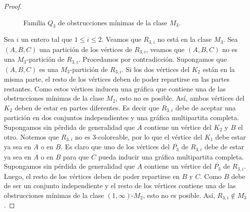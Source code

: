 \begin{proof}
\begin{figure}[ht!]
\begin{subfigure}{\textwidth}
\begin{center}
\end{center}
\end{subfigure}

\caption{Familia $Q_3$ de obstrucciones mínimas de la clase $M_3$.}
\label{obsts_M3_Q}
\end{figure}

Sea $i$ un entero tal que $1\le i \le 2$. Veamos que $R_{3,i}$ no está en la clase $M_3$. Sea $(A,B,C)$ una partición de los vértices de $R_{3,i}$, veamos que $(A,B,C)$ no es una $M_3$-partición de $R_{3,i}$. Procedamos por contradicción. Supongamos que $(A,B,C)$ es una $M_3$-partición de $R_{3,i}$. Si los dos vértices del $K_2$ están en la misma parte, el resto de los vértices deben de poder repartirse en las partes restantes. Como estos vértices inducen una gráfica que contiene una de las obstrucciones mínimas de la clase $M_2$, esto no es posible. Así, ambos vértices del $K_2$ deben de estar en partes diferentes. Es decir que $R_{3,i}$ debe de aceptar una partición en dos conjuntos independientes y una gráfica multipartita completa. Supongamos sin pérdida de generalidad que $A$ contiene un vértice del $K_2$ y $B$ el otro. Notemos que $R_{3,i}$ no es 3-coloreable, por lo que el vértice del $K_1$ debe estar ya sea en $A$ o en $B$. Es claro que uno de los vértices del $\overline{P_3}$ de $R_{3,i}$ debe de estar ya sea en $A$ o en $B$ para que $C$ pueda inducir una gráfica multipartita completa. Supongamos sin pérdida de generalidad que $A$ contiene un vértice del  $\overline{P_3}$ de $R_{3,i}$. Luego, el resto de los vértices deben de poder repartirse en $B$ y $C$. Como $B$ debe de ser un conjunto independiente y el resto de los vértices contiene una de las obstrucciones mínimas de la clase $(1,\infty)$-$M_2$, esto no es posible. Así, $R_{3,i}\notin M_3$.


\end{proof}
